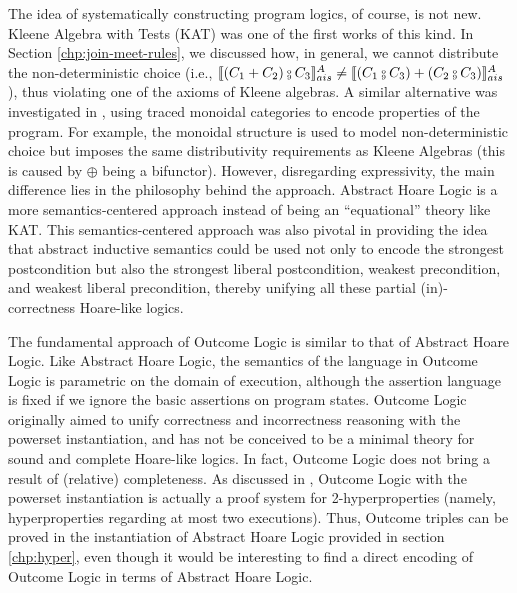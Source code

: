\documentclass[
  10pt,       %
  twoside,    %
  a4paper,    %
  english,    %
  tikz,       %
  openright,  %
]{book}
\begin{document}
The idea of systematically constructing program logics, of course, is not new. Kleene
Algebra with Tests (KAT) \cite{Kozen97} was one of the first works of this
kind. In Section \ref{chp:join-meet-rules}, we discussed how, in general, we
cannot distribute the non-deterministic choice (i.e., $\asem{(C_1 + C_2) \fcmp C_3} \neq
\asem{(C_1 \fcmp C_3) + (C_2 \fcmp C_3)}$), thus violating one of the axioms of
Kleene algebras. A similar alternative was investigated in \cite{Martin06},
using traced monoidal categories to encode properties of the program. For
example, the monoidal structure is used to model non-deterministic choice but
imposes the same distributivity requirements as Kleene Algebras (this is caused
by $\oplus$ being a bifunctor). However, disregarding expressivity, the main
difference lies in the philosophy behind the approach. Abstract Hoare Logic is
a more semantics-centered approach instead of being an ``equational'' theory like
KAT. This semantics-centered approach was also pivotal in providing the idea that
abstract inductive semantics could be used not only to encode the strongest
postcondition but also the strongest liberal postcondition, weakest
precondition, and weakest liberal precondition, thereby unifying all these partial (in)-correctness 
Hoare-like logics. 

The fundamental approach of Outcome Logic
\cite{Zilberstein23} is similar to 
that of Abstract Hoare Logic. Like Abstract Hoare Logic, the semantics of the language
in Outcome Logic is parametric on the domain of execution, although the assertion
language is fixed if we ignore the basic assertions on program states. Outcome
Logic originally aimed to unify correctness and incorrectness reasoning with
the powerset instantiation, and has not be conceived to be a minimal theory for sound and complete
Hoare-like logics. In fact, Outcome Logic does not bring a result of (relative) completeness. As
discussed in \cite{Darnier2023}, Outcome Logic with the powerset instantiation
is actually a proof system for 2-hyperproperties (namely, hyperproperties regarding at
most two executions). Thus, Outcome triples can be proved in the instantiation
of Abstract Hoare Logic provided in section \ref{chp:hyper}, even though it
would be interesting to find a direct encoding of Outcome Logic in terms of
Abstract Hoare Logic.


\backmatter
\cleardoublepage
{}
{}

\begingroup

\let\clearpage\relax
\let\cleardoublepage\relax


\printbibliography

\endgroup

\vfill
\end{document}
